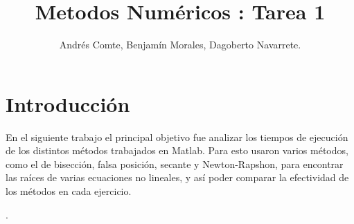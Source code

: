 \documentclass{udpreport}
\title{Metodos Numéricos : Tarea 1}
\author{Andrés Comte, Benjamín Morales, Dagoberto Navarrete.}
\begin{document}
\maketitle
\tableofcontents
\listoffigures

\chapter{Introducción}

En el siguiente trabajo el principal objetivo fue analizar los tiempos de ejecución de los distintos métodos trabajados en Matlab. Para esto usaron varios métodos, como el de bisección, falsa posición, secante y Newton-Rapshon,  para encontrar las raíces de varias ecuaciones no lineales, y así poder comparar la efectividad de los métodos en cada ejercicio.

.
\end{document}
